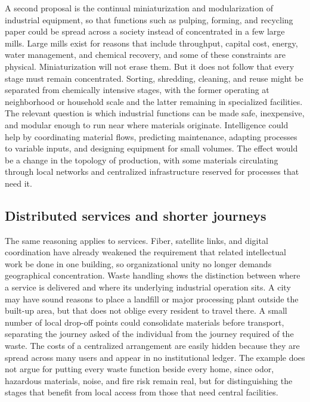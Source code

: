 \documentclass[11pt]{article}
\begin{document}
A second proposal is the continual miniaturization and modularization of industrial equipment, so that functions such as pulping, forming, and recycling paper could be spread across a society instead of concentrated in a few large mills. Large mills exist for reasons that include throughput, capital cost, energy, water management, and chemical recovery, and some of these constraints are physical. Miniaturization will not erase them. But it does not follow that every stage must remain concentrated. Sorting, shredding, cleaning, and reuse might be separated from chemically intensive stages, with the former operating at neighborhood or household scale and the latter remaining in specialized facilities. The relevant question is which industrial functions can be made safe, inexpensive, and modular enough to run near where materials originate. Intelligence could help by coordinating material flows, predicting maintenance, adapting processes to variable inputs, and designing equipment for small volumes. The effect would be a change in the topology of production, with some materials circulating through local networks and centralized infrastructure reserved for processes that need it.

\subsection{Distributed services and shorter journeys}

The same reasoning applies to services. Fiber, satellite links, and digital coordination have already weakened the requirement that related intellectual work be done in one building, so organizational unity no longer demands geographical concentration. Waste handling shows the distinction between where a service is delivered and where its underlying industrial operation sits. A city may have sound reasons to place a landfill or major processing plant outside the built-up area, but that does not oblige every resident to travel there. A small number of local drop-off points could consolidate materials before transport, separating the journey asked of the individual from the journey required of the waste. The costs of a centralized arrangement are easily hidden because they are spread across many users and appear in no institutional ledger. The example does not argue for putting every waste function beside every home, since odor, hazardous materials, noise, and fire risk remain real, but for distinguishing the stages that benefit from local access from those that need central facilities.
\end{document}
